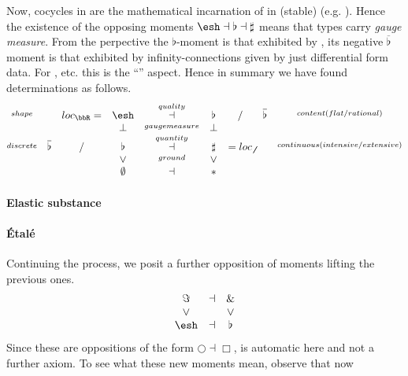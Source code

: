 Now, cocycles in  are the mathematical incarnation of  in (stable)  (e.g. ). Hence the existence of the opposing moments $\esh  \dashv \flat \dashv \sharp$ means that types carry \emph{gauge measure}.
From the  perpective the $\flat$-moment is that exhibited by , its negative $\overline{\flat}$ moment is that exhibited by infinity-connections given by just differential form data. For ,  etc. this is the ``'' aspect.
Hence in summary we have found determinations as follows.
\begin{displaymath}
\itexarray{
\stackrel{shape}{} && loc_{\bbR} = & \esh  &\stackrel{quality}{\dashv}& \flat & / & \overline{\flat}&  \stackrel{content(flat/rational)}{}
\\
&& & \bot &\stackrel{gaugemeasure}{}& \bot
\\
\stackrel{discrete}{} &\overline{\flat}& / & \flat &\stackrel{quantity}{\dashv}& \sharp & = loc_{\not\not}  &   & \stackrel{continuous (intensive/extensive)}{}
\\
&& & \vee &\stackrel{ground}{}& \vee
\\
&& & \emptyset &\dashv& \ast &
}
\end{displaymath}
\hypertarget{elastic_substance}{}\paragraph*{{Elastic substance}}\label{elastic_substance}
\hypertarget{tal}{}\paragraph*{{Étalé}}\label{tal}
Continuing the process, we posit a further opposition of moments lifting the previous ones.
\begin{displaymath}
\itexarray{
\Im &\dashv& \&
\\
\vee && \vee
\\
\esh  &\dashv& \flat
}
\end{displaymath}
Since these are oppositions of the form $\bigcirc \dashv \Box$,  is automatic here and not a further axiom.
To see what these new moments mean, observe that now
